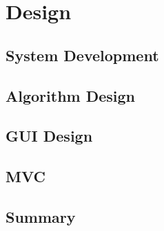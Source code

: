 \chapter{Design}

\section{System Development}
\label{SystemDev}

\section{Algorithm Design}
\label{AlgDes}

\section{GUI Design}
\label{GUIDes}

\section{MVC}
\label{MVC}

\section{Summary}
\label{DesSummary}